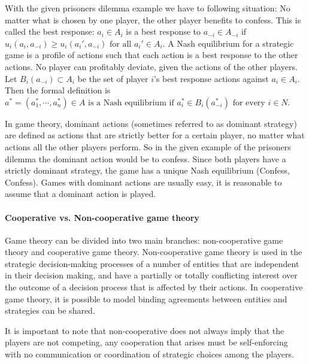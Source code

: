 With the given prisoners dilemma example we have to following situation: No matter what is chosen by one player, the other player benefits to confess. This is called the best response: $a_i \in A_i $ is a best response to $ a_{-i} \in A_{-i} $ if $u_i(a_i, a_{-i}) \geq u_i(a_{i}', a_{-i}) \mbox{ for all } a_{i}' \in A_i$.
A Nash equilibrium for a strategic game is a profile of actions such
that each action is a best response to the other actions. No player can profitably deviate, given the actions of the other players. Let $B_i(a_{-i}) \subset A_i$ be the set of player $i$'s best response actions against $a_i \in A_i$. Then the formal definition is
$a^* = (a^*_1, \cdots, a^*_n) \in A \mbox{ is a Nash equilibrium if }
	a^*_i \in B_i(a_{-i}^*) \mbox{ for every } i \in N$.

In game theory, dominant actions (sometimes referred to as dominant strategy) are defined as actions that are strictly better for a certain player, no matter what actions all the other players perform. So in the given example of the prisoners dilemma the dominant action would be to confess. Since both players have a strictly dominant strategy, the game has a unique Nash equilibrium (Confess, Confess). Games with dominant actions are usually easy, it is reasonable to assume that a dominant action is played. 

\paragraph{Cooperative vs. Non-cooperative game theory} 
Game theory can be divided into two main branches: non-cooperative game theory and cooperative game theory. Non-cooperative game theory is used in the strategic decision-making processes of a number of entities that are independent in their decision making, and have a partially or totally conflicting interest over the outcome of a decision process that is affected by their actions\cite{keypaper}. In cooperative game theory, it is possible to model binding agreements between entities and strategies can be shared. 

It is important to note that non-cooperative does not always imply that the players are not competing, any cooperation that arises must be self-enforcing with no communication or coordination of strategic choices among the players.

